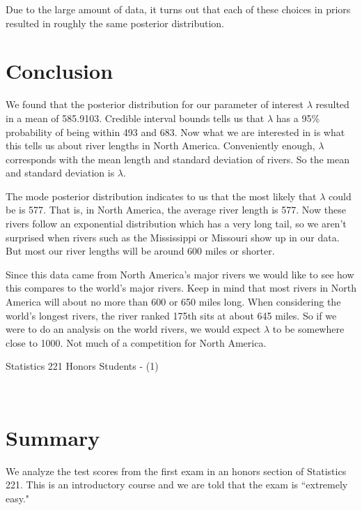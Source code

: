 \documentclass[12pt]{article}
\begin{document}
\noindent Due to the large amount of data, it turns out that each of these choices in priors resulted in roughly the same posterior distribution.

\section*{Conclusion}

\noindent We found that the posterior distribution for our parameter of interest $\lambda$ resulted in a mean of 585.9103.  Credible interval bounds tells us that $\lambda$ has a 95\% probability of being within 493 and 683.  Now what we are interested in is what this tells us about river lengths in North America.  Conveniently enough, $\lambda$ corresponds with the mean length and standard deviation of rivers.  So the mean and standard deviation is $\lambda$.
\bigskip

\noindent The mode posterior distribution indicates to us that the most likely that $\lambda$ could be is 577.  That is, in North America, the average river length is 577.  Now these rivers follow an exponential distribution which has a very long tail, so we aren't surprised when rivers such as the Mississippi or Missouri show up in our data.  But most our river lengths will be around 600 miles or shorter.
\bigskip

\noindent Since this data came from North America's major rivers we would like to see how this compares to the world's major rivers.  Keep in mind that most rivers in North America will about no more than 600 or 650 miles long.  When considering the world's longest rivers, the river ranked 175th sits at about 645 miles.  So if we were to do an analysis on the world rivers, we would expect $\lambda$ to be somewhere close to 1000.  Not much of a competition for North America.

\newpage

\begin{center}
\begin{LARGE}
\sc Statistics 221 Honors Students - (1)
\end{LARGE}
\\ [.5 cm]
\end{center}

\section*{Summary}

\noindent We analyze the test scores from the first exam in an honors section of Statistics 221.  This is an introductory course and we are told that the exam is ``extremely easy."
\end{document}
